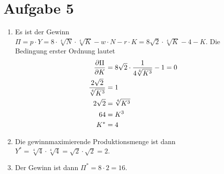 \documentclass{article}
\begin{document}
	\section*{Aufgabe 5}
	\begin{enumerate}[label=(\alph*)]
		\item Es ist der Gewinn $\Pi = p\cdot Y = 8\cdot \sqrt[4]{N}\cdot \sqrt[4]{K} - w\cdot N - r\cdot K = 8\sqrt{2}\cdot \sqrt[4]{K} - 4 - K$. Die Bedingung erster Ordnung lautet
		\begin{align}
			\frac{\partial \Pi}{\partial K} &= 8\sqrt{2}\cdot\frac{1}{4\sqrt[4]{K^3}} - 1 = 0 \notag \\
			\frac{2\sqrt{2}}{\sqrt[4]{K^3}} &= 1 \notag \\
			2\sqrt{2} &= \sqrt[4]{K^3} \notag \\
			64 &= K^3 \notag \\
			K^\ast &= 4 \notag
		\end{align}
		\item Die gewinnmaximierende Produktionsmenge ist dann $Y^\ast = \sqrt[4]{4} \cdot \sqrt[4]{4}=\sqrt{2}\cdot\sqrt{2} = 2$.
		\item Der Gewinn ist dann $\Pi^\ast = 8\cdot 2 = 16$.
	\end{enumerate}
\end{document}
